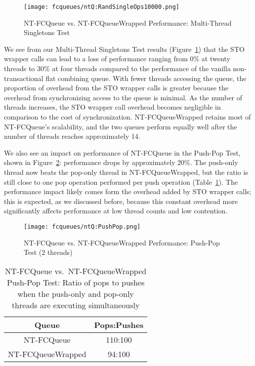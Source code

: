 \begin{figure}[t!]
    \centering
   	\begin{minipage}{\textwidth}
        {\texttt{[image: fcqueues/ntQ:RandSingleOps10000.png]}}
	\end{minipage}
   \caption{NT-FCQueue vs. NT-FCQueueWrapped Performance: Multi-Thread Singletons Test}
    \label{fig:wrappedqs}
\end{figure}


We see from our Multi-Thread Singletons Test results (Figure~\ref{fig:wrappedqs}) that the STO wrapper calls can lead to a loss of performance ranging from 0\% at twenty threads to 30\% at four threads compared to the performance of the vanilla non-transactional flat combining queue. 
 With fewer threads accessing the queue, the proportion of overhead from the STO wrapper calls is greater because the overhead from synchronizing access to the queue is minimal. As the number of threads increases, the STO wrapper call overhead becomes negligible in comparison to the cost of synchronization.
NT-FCQueueWrapped retains most of NT-FCQueue's scalability, and the two queues perform equally well after the number of threads reaches approximately 14.

We also see an impact on performance of NT-FCQueue in the Push-Pop Test, shown in Figure~\ref{fig:wrappedqs_pp}: performance drops by approximately 20\%. The push-only thread now beats the pop-only thread in NT-FCQueueWrapped, but the ratio is still close to one pop operation performed per push operation (Table~\ref{tab:nt_pop_push_ratio}). The performance impact likely comes form the overhead added by STO wrapper calls; this is expected, as we discussed before, because this constant overhead more significantly affects performance at low thread counts and low contention.


\begin{figure}[t!]
    \centering
	\begin{minipage}{0.9\textwidth}
        {\texttt{[image: fcqueues/ntQ:PushPop.png]}}
	\end{minipage}
    \caption{NT-FCQueue vs. NT-FCQueueWrapped Performance: Push-Pop Test (2 threads)}
    \label{fig:wrappedqs_pp}
\end{figure}
\begin{table}[ht!]
        \centering
    \begin{tabular}{|cc|}
        \hline
        Queue & Pops:Pushes\\
        \hline
            NT-FCQueue & 110:100\\
            NT-FCQueueWrapped & 94:100\\
        \hline
    \end{tabular}
    \caption{NT-FCQueue vs.\ NT-FCQueueWrapped Push-Pop Test: Ratio of pops to pushes when the push-only and pop-only threads are executing simultaneously}
    \label{tab:nt_pop_push_ratio}
\end{table}


